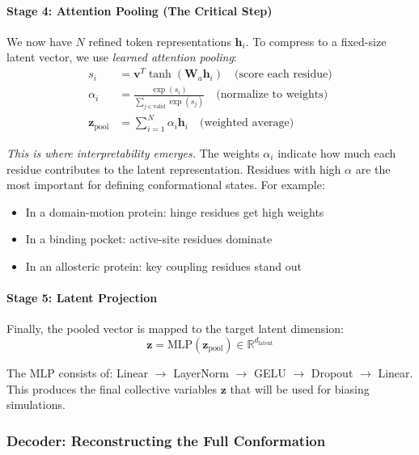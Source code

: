 \documentclass[12pt,a4paper]{article}
\begin{document}
\paragraph{Stage 4: Attention Pooling (The Critical Step)}
We now have $N$ refined token representations $\mathbf{h}_i$. To compress to a fixed-size latent vector, we use \textit{learned attention pooling}:
\begin{align}
s_i &= \mathbf{v}^T \tanh(\mathbf{W}_a \mathbf{h}_i) \quad \text{(score each residue)} \\
\alpha_i &= \frac{\exp(s_i)}{\sum_{j \in \text{valid}} \exp(s_j)} \quad \text{(normalize to weights)} \\
\mathbf{z}_{\text{pool}} &= \sum_{i=1}^{N} \alpha_i \mathbf{h}_i \quad \text{(weighted average)}
\end{align}

\textit{This is where interpretability emerges.} The weights $\alpha_i$ indicate how much each residue contributes to the latent representation. Residues with high $\alpha$ are the most important for defining conformational states. For example:
\begin{itemize}
    \item In a domain-motion protein: hinge residues get high weights
    \item In a binding pocket: active-site residues dominate
    \item In an allosteric protein: key coupling residues stand out
\end{itemize}

\paragraph{Stage 5: Latent Projection}
Finally, the pooled vector is mapped to the target latent dimension:
\begin{equation}
\mathbf{z} = \text{MLP}(\mathbf{z}_{\text{pool}}) \in \mathbb{R}^{d_{\text{latent}}}
\end{equation}

The MLP consists of: Linear $\rightarrow$ LayerNorm $\rightarrow$ GELU $\rightarrow$ Dropout $\rightarrow$ Linear. This produces the final collective variables $\mathbf{z}$ that will be used for biasing simulations.

\subsubsection{Decoder: Reconstructing the Full Conformation}
\end{document}
